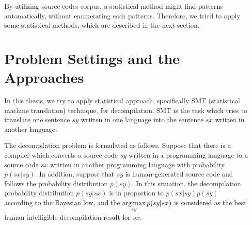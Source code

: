 \documentclass[senior,final,11pt]{iscs-thesis}
\newcommand{\argmax}{\mathop{\rm arg\,max}\limits}
\begin{document}
By utilizing source codes corpus, a statistical method might find patterns automatically, without enumerating each patterns.
Therefore, we tried to apply some statistical methods, which are described in the next section.















\section{Problem Settings and the Approaches}

In this thesis, we try to apply statistical approach, specifically SMT (statistical machine translation) technique, for decompilation.
SMT is the task which tries to translate one sentence $sy$ written in one language into the sentence $sx$ written in another language.

The decompilation problem is formulated as follows. 
Suppose that there is a compiler which converts a source code $ sy $ written in a programming language 
to a source code $ sx $  written in another programming language with probability $p(sx|sy)$.
In addition, suppose that $ sy $ is human-generated source code and follows the probability distribution $ p(sy) $.
In this situation, the decompilation probability distribution $ p(sy|sx) $ is in proportion to $ p(sx|sy)p(sy) $ according to the Bayesian low, 
and the $\argmax_{sy} p(sy|sx)$ is considered as the best human-intelligible decompilation result for $sx$.
\end{document}
